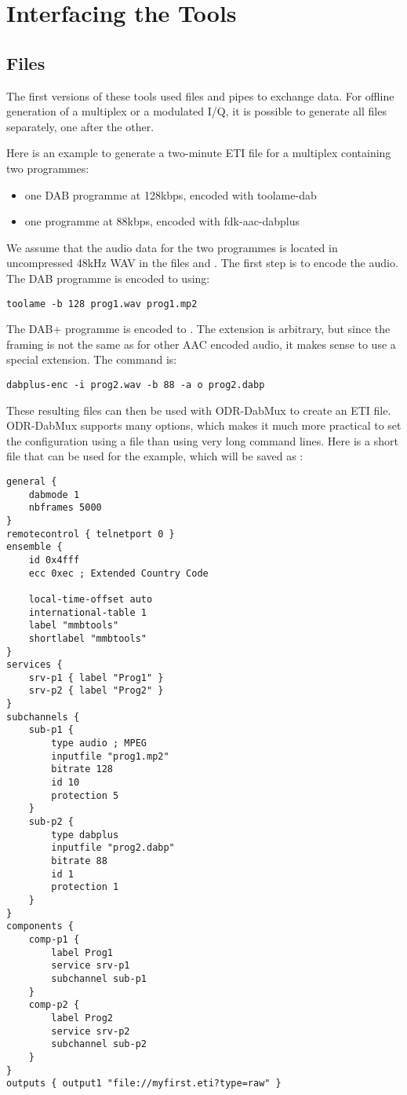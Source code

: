 \section{Interfacing the Tools}
\subsection{Files}
\label{sec-files}
The first versions of these tools used files and pipes to exchange data. For
offline generation of a multiplex or a modulated I/Q, it is possible to
generate all files separately, one after the other.

Here is an example to generate a two-minute ETI file for a multiplex containing two programmes:
\begin{itemize}
    \item one DAB programme at 128kbps, encoded with toolame-dab
    \item one \dabplus{} programme at 88kbps, encoded with fdk-aac-dabplus
\end{itemize}

We assume that the audio data for the two programmes is located in uncompressed
48kHz WAV in the files  and . The first step
is to encode the audio. The DAB programme is encoded to  using:
\begin{lstlisting}
toolame -b 128 prog1.wav prog1.mp2
\end{lstlisting}

The DAB+ programme is encoded to . The extension
 is arbitrary, but since the framing is not the same as for
other AAC encoded audio, it makes sense to use a special extension. The command
is:
\begin{lstlisting}
dabplus-enc -i prog2.wav -b 88 -a o prog2.dabp
\end{lstlisting}

These resulting files can then be used with ODR-DabMux to create an ETI file.
ODR-DabMux supports many options, which makes it much more practical to set
the configuration using a file than using very long command lines. Here is a short
file that can be used for the example, which will be saved as :
\begin{lstlisting}
general {
    dabmode 1
    nbframes 5000
}
remotecontrol { telnetport 0 }
ensemble {
    id 0x4fff
    ecc 0xec ; Extended Country Code

    local-time-offset auto
    international-table 1
    label "mmbtools"
    shortlabel "mmbtools"
}
services {
    srv-p1 { label "Prog1" }
    srv-p2 { label "Prog2" }
}
subchannels {
    sub-p1 {
        type audio ; MPEG
        inputfile "prog1.mp2"
        bitrate 128
        id 10
        protection 5
    }
    sub-p2 {
        type dabplus
        inputfile "prog2.dabp"
        bitrate 88
        id 1
        protection 1
    }
}
components {
    comp-p1 {
        label Prog1
        service srv-p1
        subchannel sub-p1
    }
    comp-p2 {
        label Prog2
        service srv-p2
        subchannel sub-p2
    }
}
outputs { output1 "file://myfirst.eti?type=raw" }
\end{lstlisting}

